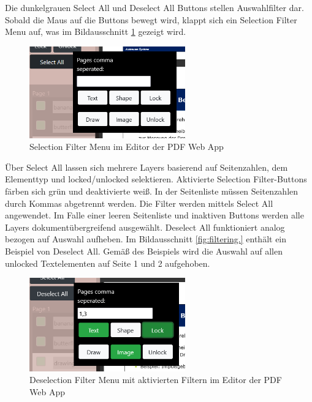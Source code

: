 Die dunkelgrauen Select All und Deselect All Buttons stellen Auswahlfilter dar. Sobald die Maus auf die Buttons bewegt wird, klappt sich ein Selection Filter Menu auf, was im Bildausschnitt \ref{fig:filtermenu} gezeigt wird. 

\begin{figure}[!htbp]
	\centering
	\includegraphics[width=0.6\textwidth]{"images/filtermenu.png"}
	\caption{Selection Filter Menu im Editor der PDF Web App}
	\label{fig:filtermenu}
\end{figure}

Über Select All lassen sich mehrere Layers basierend auf Seitenzahlen, dem Elementtyp und locked/unlocked selektieren. Aktivierte Selection Filter-Buttons färben sich grün und deaktivierte weiß. In der Seitenliste müssen Seitenzahlen durch Kommas abgetrennt werden. Die Filter werden mittels Select All angewendet. Im Falle einer leeren Seitenliste und inaktiven Buttons werden alle Layers dokumentübergreifend ausgewählt. Deselect All funktioniert analog bezogen auf Auswahl aufheben. Im Bildausschnitt \ref{fig:filtering.} enthält ein Beispiel von Deselect All. Gemäß des Beispiels wird die Auswahl auf allen unlocked Textelementen auf Seite 1 und 2 aufgehoben. 

\begin{figure}[!htbp]
	\centering
	\includegraphics[width=0.6\textwidth]{"images/filtering.png"}
	\caption{Deselection Filter Menu mit aktivierten Filtern im Editor der PDF Web App}
	\label{fig:filtering}
\end{figure}

